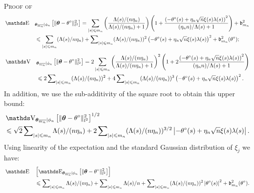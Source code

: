 \begin{pro}{\textsc{Proof of }\\}
\begin{alignat*}{2}
&\E &&_{\boldsymbol{\theta}_{\overline{m_{n}}} \vert \phi_{n}}\left[\Vert \boldsymbol{\theta} - \theta^{\circ} \Vert_{l^{2}}^{2}\right] = \sum\limits_{\vert s \vert \leq m_{n}} \left(\frac{\Lambda(s)/(n \eta_{n})}{\Lambda(s)/(n \eta_{n}) + 1}\right)\left(1 + \frac{\left(- \theta^{\circ}(s) + \eta_{n} \sqrt{n} \xi(s) \lambda(s)\right)^{2}}{(\eta_{n} n)/\Lambda(s) + 1}\right) + \mathfrak{b}_{m_{n}}^{2}\\
& && \leq \sum\limits_{\vert s \vert \leq m_{n}} (\Lambda(s)/n \eta_{n}) + \sum\nolimits_{\vert s \vert \leq m_{n}} (\Lambda(s)/(n \eta_{n}))^{2}\left(- \theta^{\circ}(s) + \eta_{n} \sqrt{n} \xi(s) \lambda(s)\right)^{2} + \mathfrak{b}_{m_{n}}^{2}(\theta^{\circ});
\end{alignat*}
\begin{alignat*}{2}
&\V&&_{\boldsymbol{\theta}_{\overline{m_{n}}} \vert \phi_{n}}\left[\Vert \boldsymbol{\theta} - \theta^{\circ} \Vert_{l^{2}}^{2}\right] = 2 \sum\limits_{\vert s \vert \leq m_{n}} \left(\frac{\Lambda(s)/(n \eta_{n})}{\Lambda(s)/(n \eta_{n}) + 1}\right)^{2}\left(1 + 2 \frac{\left(- \theta^{\circ}(s) + \eta_{n} \sqrt{n} \xi(s) \lambda(s)\right)^{2}}{(\eta_{n} n)/\Lambda(s) + 1}\right)\\
& &&\leq 2 \sum\nolimits_{\vert s \vert \leq m_{n}} (\Lambda(s)/(n \eta_{n}))^{2} + 4 \sum\nolimits_{\vert s \vert \leq m_{n}} (\Lambda(s)/(n \eta_{n}))^{3} \left(- \theta^{\circ}(s) + \eta_{n} \sqrt{n} \xi(s) \lambda(s)\right)^{2}.
\end{alignat*}
In addition, we use the sub-additivity of the square root to obtain this upper bound:
\begin{alignat*}{1}
& \V_{\boldsymbol{\theta}_{\overline{m_{n}}} \vert \phi_{n}}\left[\Vert \boldsymbol{\theta} - \theta^{\circ} \Vert_{l^{2}}^{2}\right]^{1/2}\\
& \leq \sqrt{2} \sum\nolimits_{\vert s \vert \leq m_{n}} \Lambda(s)/(n \eta_{n}) + 2 \sum\nolimits_{\vert s \vert \leq m_{n}} (\Lambda(s)/(n \eta_{n}))^{3/2} \left\vert- \theta^{\circ}(s) + \eta_{n} \sqrt{n} \xi(s) \lambda(s)\right\vert.
\end{alignat*}
Using linearity of the expectation and the standard Gaussian distribution of $\xi_{j}$ we have:
\begin{alignat*}{2}
&\E&&\left[\E_{\boldsymbol{\theta}_{\overline{m_{n}}} \vert \phi_{n}}\left[\Vert \boldsymbol{\theta} - \theta^{\circ} \Vert_{l^{2}}^{2}\right]\right]\\
& &&\leq \sum\nolimits_{\vert s \vert \leq m_{n}} \Lambda(s)/(n \eta_{n}) + \sum\nolimits_{\vert s \vert \leq m_{n}} \Lambda(s)/n + \sum\nolimits_{\vert s \vert \leq m_{n}}(\Lambda(s)/(n \eta_{n}))^{2} \left\vert \theta^{\circ}(s) \right\vert^{2} + \mathfrak{b}_{m_{n}}^{2}(\theta^{\circ}).

\end{alignat*}
\end{pro}
